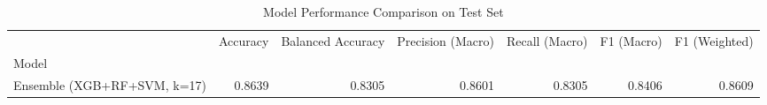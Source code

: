 \begin{table}
\caption{Model Performance Comparison on Test Set}
\label{tab:model_comparison}
\begin{tabular}{lrrrrrr}
\toprule
 & Accuracy & Balanced Accuracy & Precision (Macro) & Recall (Macro) & F1 (Macro) & F1 (Weighted) \\
Model &  &  &  &  &  &  \\
\midrule
Ensemble (XGB+RF+SVM, k=17) & 0.8639 & 0.8305 & 0.8601 & 0.8305 & 0.8406 & 0.8609 \\
\bottomrule
\end{tabular}
\end{table}
